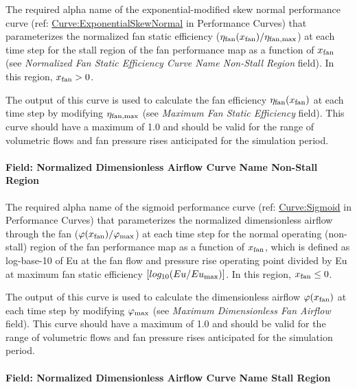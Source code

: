 The required alpha name of the exponential-modified skew normal performance curve (ref: \hyperref[curveexponentialskewnormal]{Curve:ExponentialSkewNormal} in Performance Curves) that parameterizes the normalized fan static efficiency (\(\eta_{\rm{fan}} (x_{\rm{fan}}) / \eta_{\rm{fan, max}}\)) at each time step for the stall region of the fan performance map as a function of \(x_{\rm{fan}}\) (see \emph{Normalized Fan Static Efficiency Curve Name Non-Stall Region} field). In this region, \(x_{\rm{fan}} > 0\).

The output of this curve is used to calculate the fan efficiency \(\eta_{\rm{fan}} ( x_{\rm{fan}} )\) at each time step by modifying \(\eta_{\rm{fan, max}}\) (see \emph{Maximum Fan Static Efficiency} field). This curve should have a maximum of 1.0 and should be valid for the range of volumetric flows and fan pressure rises anticipated for the simulation period.

\paragraph{Field: Normalized Dimensionless Airflow Curve Name Non-Stall Region}\label{field-normalized-dimensionless-airflow-curve-name-non-stall-region}

The required alpha name of the sigmoid performance curve (ref: \hyperref[curvesigmoid]{Curve:Sigmoid} in Performance Curves) that parameterizes the normalized dimensionless airflow through the fan (\(\varphi (x_{\rm{fan}}) / \varphi_{\rm{max}}\)) at each time step for the normal operating (non-stall) region of the fan performance map as a function of \(x_{\rm{fan}}\), which is defined as log-base-10 of Eu at the fan flow and pressure rise operating point divided by Eu at maximum fan static efficiency \([log_{10}(Eu / Eu_{\rm{max}})]\). In this region, \(x_{\rm{fan}} \le 0\).

The output of this curve is used to calculate the dimensionless airflow \(\varphi (x_{\rm{fan}})\) at each time step by modifying \(\varphi_{\rm{max}}\) (see \emph{Maximum Dimensionless Fan Airflow} field). This curve should have a maximum of 1.0 and should be valid for the range of volumetric flows and fan pressure rises anticipated for the simulation period.

\paragraph{Field: Normalized Dimensionless Airflow Curve Name Stall Region}\label{field-normalized-dimensionless-airflow-curve-name-stall-region}

